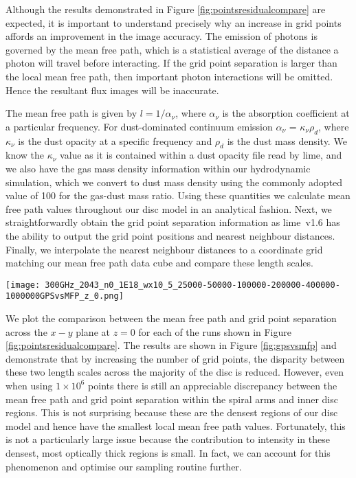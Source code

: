 \documentclass[fleqn,usenatbib]{mnras}
\newcommand{\lime}{{\sc lime}}
\begin{document}
\smallskip

Although the results demonstrated in Figure \ref{fig:pointsresidualcompare} are expected, it is important to understand precisely why an increase in grid points affords an improvement in the image accuracy. The emission of photons is governed by the mean free path, which is a statistical average of the distance a photon will travel before interacting. If the grid point separation is larger than the local mean free path, then important photon interactions will be omitted. Hence the resultant flux images will be inaccurate.

\smallskip

The mean free path is given by $l = 1/\alpha_{\nu}$, where $\alpha_{\nu}$ is the absorption coefficient at a particular frequency. For dust-dominated continuum emission $\alpha_{\nu}$ = $\kappa_{\nu}\rho_d$, where $\kappa_{\nu}$ is the dust opacity at a specific frequency and $\rho_d$ is the dust mass density. We know the $\kappa_{\nu}$ value as it is contained within a dust opacity file read by \lime, and we also have the gas mass density information within our hydrodynamic simulation, which we convert to dust mass density using the commonly adopted value of 100 for the gas-dust mass ratio. Using these quantities we calculate mean free path values throughout our disc model in an analytical fashion. Next, we straightforwardly obtain the grid point separation information as \lime\ v1.6 has the ability to output the grid point positions and nearest neighbour distances. Finally, we interpolate the nearest neighbour distances to a coordinate grid matching our mean free path data cube and compare these length scales.

\begin{figure*}
    \texttt{[image: 300GHz\_2043\_n0\_1E18\_wx10\_5\_25000-50000-100000-200000-400000-1000000GPSvsMFP\_z\_0.png]}
    \caption{Residual of grid point separation (GPS), $s$, and mean free path (MFP), $l$, at the disc midplane for \lime\ runs using the indicated number of grid points and standard sampling. We define this residual as (s-l)/(s+l).}
    \label{fig:gpsvsmfp}
\end{figure*}

We plot the comparison between the mean free path and grid point separation across the $x-y$ plane at $z = 0$ for each of the runs shown in Figure \ref{fig:pointsresidualcompare}. The results are shown in Figure \ref{fig:gpsvsmfp} and demonstrate that by increasing the number of grid points, the disparity between these two length scales across the majority of the disc is reduced. However, even when using $1 \times 10^6$ points there is still an appreciable discrepancy between the mean free path and grid point separation within the spiral arms and inner disc regions. This is not surprising because these are the densest regions of our disc model and hence have the smallest local mean free path values. Fortunately, this is not a particularly large issue because the contribution to intensity in these densest, most optically thick regions is small. In fact, we can account for this phenomenon and optimise our sampling routine further.
\end{document}

